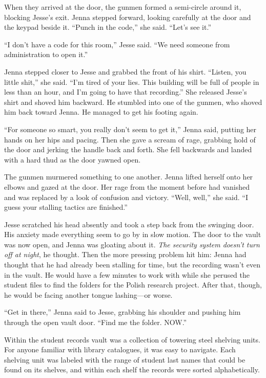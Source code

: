 \documentclass[12pt]{book}
\begin{document}
When they arrived at the door, the gunmen formed a semi-circle around it, blocking Jesse's exit.  Jenna stepped forward, looking carefully at the door and the keypad beside it.  ``Punch in the code,'' she said.  ``Let's see it.''

``I don't have a code for this room,'' Jesse said.  ``We need someone from administration to open it.''

Jenna stepped closer to Jesse and grabbed the front of his shirt.  ``Listen, you little shit,'' she said.  ``I'm tired of your lies.  This building will be full of people in less than an hour, and I'm going to have that recording.''  She released Jesse's shirt and shoved him backward.  He stumbled into one of the gunmen, who shoved him back toward Jenna.  He managed to get his footing again.

``For someone so smart, you really don't seem to get it,'' Jenna said, putting her hands on her hips and pacing.  Then she gave a scream of rage, grabbing hold of the door and jerking the handle back and forth.  She fell backwards and landed with a hard thud as the door yawned open.

The gunmen murmered something to one another.  Jenna lifted herself onto her elbows and gazed at the door.  Her rage from the moment before had vanished and was replaced by a look of confusion and victory.  ``Well, well,'' she said.  ``I guess your stalling tactics are finished.''

Jesse scratched his head absently and took a step back from the swinging door.  His anxiety made everything seem to go by in slow motion.  The door to the vault was now open, and Jenna was gloating about it.  \emph{The security system doesn't turn off at night}, he thought.  Then the more pressing problem hit him: Jenna had thought that he had already been stalling for time, but the recording wasn't even in the vault.  He would have a few minutes to work with while she perused the student files to find the folders for the Polish research project.  After that, though, he would be facing another tongue lashing---or worse.

``Get in there,'' Jenna said to Jesse, grabbing his shoulder and pushing him through the open vault door.  ``Find me the folder.  NOW.''

Within the student records vault was a collection of towering steel shelving units.  For anyone familiar with library catalogues, it was easy to navigate.  Each shelving unit was labeled with the range of student last names that could be found on its shelves, and within each shelf the records were sorted alphabetically.
\end{document}
